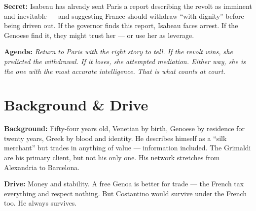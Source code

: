\clearpage
\begin{secretbox}
\textbf{Secret:} Isabeau has already sent Paris a report describing the revolt as
imminent and inevitable --- and suggesting France should withdraw ``with dignity''
before being driven out. If the governor finds this report, Isabeau faces arrest.
If the Genoese find it, they might trust her --- or use her as leverage.

\medskip\noindent\textcolor{SecretRed}{\textbf{Agenda:}} \textit{Return to Paris
with the right story to tell. If the revolt wins, she predicted the withdrawal.
If it loses, she attempted mediation. Either way, she is the one with the most
accurate intelligence. That is what counts at court.}
\end{secretbox}

\clearpage


\section*{Background \& Drive}
\begin{rulebox}{}
\textbf{Background:} Fifty-four years old, Venetian by birth, Genoese by residence
for twenty years, Greek by blood and identity. He describes himself as a ``silk
merchant'' but trades in anything of value --- information included. The Grimaldi
are his primary client, but not his only one. His network stretches from Alexandria
to Barcelona.

\medskip\noindent\textcolor{GrimaldiPurple}{\textbf{Drive:}} Money and stability.
A free Genoa is better for trade --- the French tax everything and respect nothing.
But Costantino would survive under the French too. He always survives.
\end{rulebox}

